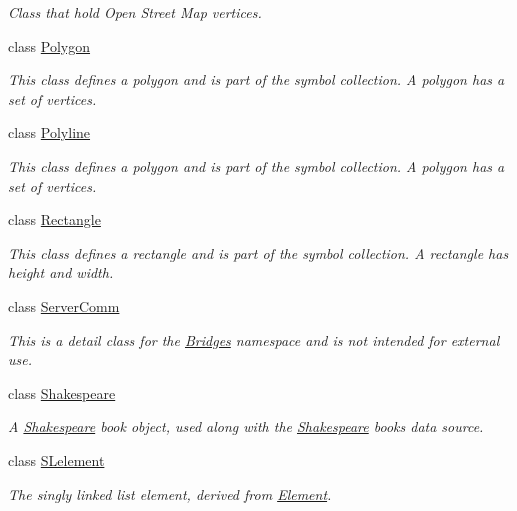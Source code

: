 \begin{DoxyCompactItemize}
\begin{DoxyCompactList}\small\item\em Class that hold Open Street Map vertices. \end{DoxyCompactList}\item 
class \mbox{\hyperlink{classbridges_1_1_polygon}{Polygon}}
\begin{DoxyCompactList}\small\item\em This class defines a polygon and is part of the symbol collection. A polygon has a set of vertices. \end{DoxyCompactList}\item 
class \mbox{\hyperlink{classbridges_1_1_polyline}{Polyline}}
\begin{DoxyCompactList}\small\item\em This class defines a polygon and is part of the symbol collection. A polygon has a set of vertices. \end{DoxyCompactList}\item 
class \mbox{\hyperlink{classbridges_1_1_rectangle}{Rectangle}}
\begin{DoxyCompactList}\small\item\em This class defines a rectangle and is part of the symbol collection. A rectangle has height and width. \end{DoxyCompactList}\item 
class \mbox{\hyperlink{classbridges_1_1_server_comm}{Server\+Comm}}
\begin{DoxyCompactList}\small\item\em This is a detail class for the \mbox{\hyperlink{classbridges_1_1_bridges}{Bridges}} namespace and is not intended for external use. \end{DoxyCompactList}\item 
class \mbox{\hyperlink{classbridges_1_1_shakespeare}{Shakespeare}}
\begin{DoxyCompactList}\small\item\em A \mbox{\hyperlink{classbridges_1_1_shakespeare}{Shakespeare}} book object, used along with the \mbox{\hyperlink{classbridges_1_1_shakespeare}{Shakespeare}} books data source. \end{DoxyCompactList}\item 
class \mbox{\hyperlink{classbridges_1_1_s_lelement}{S\+Lelement}}
\begin{DoxyCompactList}\small\item\em The singly linked list element, derived from \mbox{\hyperlink{classbridges_1_1_element}{Element}}. \end{DoxyCompactList}\item 

\end{DoxyCompactItemize}
